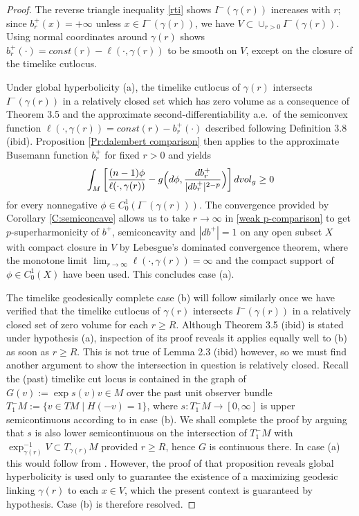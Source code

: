 \documentclass[12pt]{amsart}
\newcommand{\vol}{{\rm vol}}
\newcommand{\vg}{\vol_g}
\newcommand{\orange}{\color{orange}}
\begin{document}
\begin{proof} The reverse triangle inequality \eqref{rti} shows
$I^-(\gamma(r))$ increases with $r$;  since $b^+_r(x) = +\infty$ unless $x \in I^-(\gamma(r))$, we have $V \subset \cup_{r>0} I^-(\gamma(r))$.
Using normal coordinates around $\gamma(r)$
shows $b^+_r(\cdot)=const(r)-\ell(\cdot,\gamma(r))$ to be smooth on $V$, except on the closure of the timelike cutlocus.

{Under global hyperbolicity} (a),  the timelike cutlocus of 
$\gamma(r)$ intersects $I^-(\gamma(r))$ in a 
relatively closed set \cite[Lemma 2.3]{McCann20} 
which has zero volume as a consequence of Theorem 3.5
and the 
approximate second-differentiability a.e.\ of the semiconvex function $ \ell(\cdot, \gamma(r)) = const(r)-b_r^+(\cdot)$ 
described following Definition 3.8 (ibid).
Proposition \ref{Pr:dalembert comparison} then applies to the approximate Busemann function $b_r^+$ for fixed $r>0$ and yields
\begin{equation}\label{weak p-comparison}
\int_{M} \left[\frac{(n-1)\phi}{\ell(\cdot,\gamma(r))} - g\Big(d\phi, %
\frac{db^+_r}{|db^+_r|^{2-p}}\Big)\right] d\vg \ge 0
\end{equation}
for  every nonnegative $\phi \in C^1_0(I^-(\gamma(r)))$. 
The convergence provided by Corollary \ref{C:semiconcave} allows us to take $r \to \infty$ in \eqref{weak p-comparison} to get $p$-superharmonicity of $b^+$, semiconcavity and $|db^+|=1$ on any open subset $X$ with compact closure in $V$ by Lebesgue's dominated convergence theorem, where the monotone limit $\lim_{r\to \infty}\ell(\cdot,\gamma(r))= \infty$ and the compact support of $\phi \in C^1_0(X)$ have been used. 
This concludes case (a).

{The timelike geodesically complete} case (b) will follow similarly once we have verified that
the timelike cutlocus of $\gamma(r)$ intersects $I^-(\gamma(r))$
in a relatively closed set of zero volume for each $r \ge R$.
Although Theorem 3.5 (ibid) is stated under hypothesis (a),  inspection
of its proof reveals it applies equally well to (b) as soon as $r \ge R$.
This is not true of Lemma 2.3 (ibid) however, so we must find another argument to show the intersection in question is relatively closed.
Recall the (past) timelike cut locus is contained in the graph of 
$G(v) := \exp s(v)v \in M$ over the past unit observer bundle
$T^-_{1}M := \{v \in TM \mid H(-v)=1 \}$, where $s:T^-_{1}M \longrightarrow [0,\infty]$ is upper semicontinuous according to
\cite[Proposition 9.5]{BeemEhrlichEasley96} in case (b).  We shall complete the proof by arguing that $s$ is also lower semicontinuous on the intersection of $T^-_1 M$ with $\exp_{\gamma(r)}^{-1} V \subset T_{\gamma(r)} M$ provided $r \ge R$,  hence $G$ is continuous there.
In case (a) this would follow from \cite[Proposition 9.7]{BeemEhrlichEasley96}. However, the proof of that proposition reveals global hyperbolicity is used only to guarantee the existence of a maximizing geodesic linking $\gamma(r)$ to each $x \in V$,  which the present context is guaranteed by hypothesis. Case (b) is therefore resolved.
\end{proof}
\end{document}
